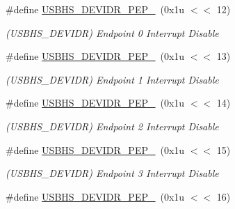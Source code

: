 \begin{DoxyCompactItemize}
\mbox{\label{group__SAME70__USBHS_ga4d786bb6a453f549dee7c43ca99e73a1}} 
\#define \mbox{\hyperlink{group__SAME70__USBHS_ga4d786bb6a453f549dee7c43ca99e73a1}{U\+S\+B\+H\+S\+\_\+\+D\+E\+V\+I\+D\+R\+\_\+\+P\+E\+P\+\_}}~(0x1u $<$$<$ 12)
\begin{DoxyCompactList}\small\item\em (U\+S\+B\+H\+S\+\_\+\+D\+E\+V\+I\+DR) Endpoint 0 Interrupt Disable \end{DoxyCompactList}\item 
\mbox{\label{group__SAME70__USBHS_ga0d895e9bfbc5570ddca744f009cd5fc7}} 
\#define \mbox{\hyperlink{group__SAME70__USBHS_ga0d895e9bfbc5570ddca744f009cd5fc7}{U\+S\+B\+H\+S\+\_\+\+D\+E\+V\+I\+D\+R\+\_\+\+P\+E\+P\+\_}}~(0x1u $<$$<$ 13)
\begin{DoxyCompactList}\small\item\em (U\+S\+B\+H\+S\+\_\+\+D\+E\+V\+I\+DR) Endpoint 1 Interrupt Disable \end{DoxyCompactList}\item 
\mbox{\label{group__SAME70__USBHS_gade1490357edec0e625b63ce3394b84a5}} 
\#define \mbox{\hyperlink{group__SAME70__USBHS_gade1490357edec0e625b63ce3394b84a5}{U\+S\+B\+H\+S\+\_\+\+D\+E\+V\+I\+D\+R\+\_\+\+P\+E\+P\+\_}}~(0x1u $<$$<$ 14)
\begin{DoxyCompactList}\small\item\em (U\+S\+B\+H\+S\+\_\+\+D\+E\+V\+I\+DR) Endpoint 2 Interrupt Disable \end{DoxyCompactList}\item 
\mbox{\label{group__SAME70__USBHS_ga2a74174e1a0ef142393f6185ddd6154d}} 
\#define \mbox{\hyperlink{group__SAME70__USBHS_ga2a74174e1a0ef142393f6185ddd6154d}{U\+S\+B\+H\+S\+\_\+\+D\+E\+V\+I\+D\+R\+\_\+\+P\+E\+P\+\_}}~(0x1u $<$$<$ 15)
\begin{DoxyCompactList}\small\item\em (U\+S\+B\+H\+S\+\_\+\+D\+E\+V\+I\+DR) Endpoint 3 Interrupt Disable \end{DoxyCompactList}\item 
\mbox{\label{group__SAME70__USBHS_gac0c4d5faf32123d5991bcc666405b3ac}} 
\#define \mbox{\hyperlink{group__SAME70__USBHS_gac0c4d5faf32123d5991bcc666405b3ac}{U\+S\+B\+H\+S\+\_\+\+D\+E\+V\+I\+D\+R\+\_\+\+P\+E\+P\+\_}}~(0x1u $<$$<$ 16)
$$
\end{DoxyCompactItemize}
